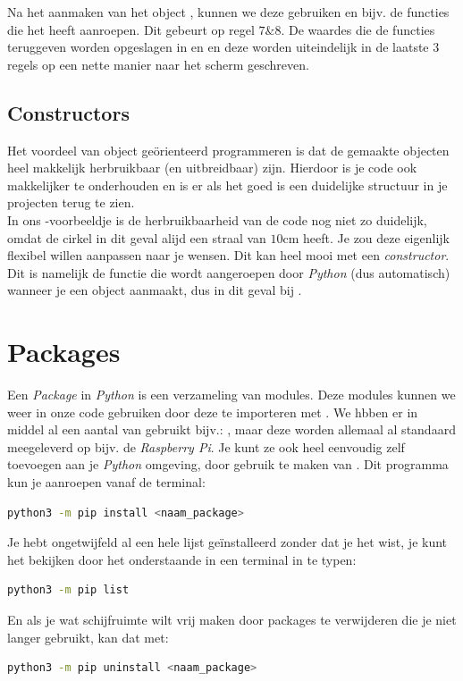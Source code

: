Na het aanmaken van het object , kunnen we deze gebruiken en bijv. de functies die het heeft aanroepen. Dit gebeurt op regel $7 \& 8$. De waardes die de functies teruggeven worden opgeslagen in  en  en deze worden uiteindelijk in de laatste $3$ regels op een nette manier naar het scherm geschreven. 

\subsection{Constructors}
Het voordeel van object geörienteerd programmeren is dat de gemaakte objecten heel makkelijk herbruikbaar (en uitbreidbaar) zijn. Hierdoor is je code ook makkelijker te onderhouden en is er als het goed is een duidelijke structuur in je projecten terug te zien. \\
In ons -voorbeeldje is de herbruikbaarheid van de code nog niet zo duidelijk, omdat de cirkel in dit geval alijd een straal van $10$cm heeft. Je zou deze eigenlijk flexibel willen aanpassen naar je wensen. Dit kan heel mooi met een \textit{constructor}. Dit is namelijk de functie die wordt aangeroepen door \textit{Python} (dus automatisch) wanneer je een object aanmaakt, dus in dit geval bij .


\newpage

\section{Packages}
Een \textit{Package} in \textit{Python} is een verzameling van modules. Deze modules kunnen we weer in onze code gebruiken door deze te importeren met . We hbben er in middel al een aantal van gebruikt bijv.: , maar deze worden allemaal al standaard meegeleverd op bijv. de \textit{Raspberry Pi}. Je kunt ze ook heel eenvoudig zelf toevoegen aan je \textit{Python} omgeving, door gebruik te maken van . Dit programma kun je aanroepen vanaf de terminal:

\begin{lstlisting}[language=bash]
python3 -m pip install <naam_package>
\end{lstlisting}

\begin{remark}
Je hebt ongetwijfeld al een hele lijst geïnstalleerd zonder dat je het wist, je kunt het bekijken door het onderstaande in een terminal in te typen: 
\begin{lstlisting}[language=bash]
python3 -m pip list
\end{lstlisting}
En als je wat schijfruimte wilt vrij maken door packages te verwijderen die je niet langer gebruikt, kan dat met:
\begin{lstlisting}[language=bash]
python3 -m pip uninstall <naam_package>
\end{lstlisting}
\end{remark}

